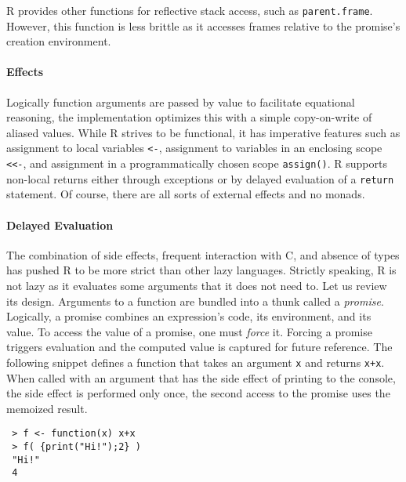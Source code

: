 \documentclass[screen,acmsmall]{acmart}
\renewcommand{\c}[1]{\lstinline |#1|\xspace}
\begin{document}
R provides other functions for reflective stack access, such as
\c{parent.frame}. However, this function is less brittle as it accesses frames
relative to the promise's creation environment.

\paragraph{Effects} Logically function arguments are passed by value to
facilitate equational reasoning, the implementation optimizes this with a simple
copy-on-write of aliased values. While R strives to be functional, it has
imperative features such as assignment to local variables \c{<-}, assignment
to variables in an enclosing scope \c{<<-}, and assignment in a
programmatically chosen scope \c{assign()}. R supports non-local returns
either through exceptions or by delayed evaluation of a \c{return} statement.
Of course, there are all sorts of external effects and no monads.

\paragraph{Delayed Evaluation}
The combination of side effects, frequent interaction with C, and absence of
types has pushed R to be more strict than other lazy languages. Strictly
speaking, R is not lazy as it evaluates some arguments that it does not need to.
Let us review its design. Arguments to a function are bundled into a thunk
called a \emph{promise}. Logically, a promise combines an expression's code, its
environment, and its value. To access the value of a promise, one must
\emph{force} it. Forcing a promise triggers evaluation and the computed value is
captured for future reference. The following snippet defines a function that
takes an argument \c x and returns \c{x+x}. When called with an argument
that has the side effect of printing to the console, the side effect is
performed only once, the second access to the promise uses the memoized result.

\begin{lstlisting}
 > f <- function(x) x+x
 > f( {print("Hi!");2} )
 "Hi!"
 4
\end{lstlisting}
\end{document}
